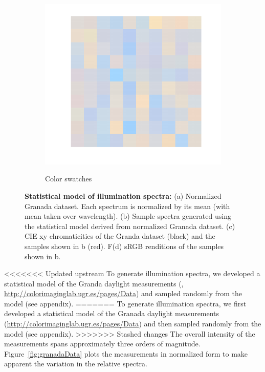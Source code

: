 \documentclass{jov}
\begin{document}
\begin{figure}
\begin{subfigure}[b]{0.24 \textwidth}
        \label{fig:xyDiagram}
        \end{subfigure}
      	\begin{subfigure}[b]{0.24 \textwidth}
    \centering
        \caption{Color swatches}
        \includegraphics[width=\textwidth]{../FiguresDraft4/Figure6/Figure6_d.pdf}
        \label{fig:sRGBIlluminant}
    \end{subfigure}
    \caption{{\bf Statistical model of illumination spectra:} (a) Normalized Granada dataset. Each spectrum is normalized by its mean (with mean taken over wavelength). (b) Sample spectra generated using the statistical model derived from normalized Granada dataset. (c) CIE xy chromaticities of the Granda dataset (black) and the samples shown in b (red). F(d) sRGB renditions of the samples shown in b.}
\label{fig:illuminant}
\end{figure}

<<<<<<< Updated upstream
To generate illumination spectra, we developed a statistical model of the Granda daylight measurements (, \href{http://colorimaginglab.ugr.es/pages/Data}{http://colorimaginglab.ugr.es/pages/Data}) and sampled randomly from the model (see appendix).
=======
To generate illumination spectra, we first developed a statistical model of the Granada daylight measurements (\href{http://colorimaginglab.ugr.es/pages/Data}{http://colorimaginglab.ugr.es/pages/Data}) \cite{hernandez2001color} and then sampled randomly from the model (see appendix).
>>>>>>> Stashed changes
The overall intensity of the measurements spans approximately three orders of magnitude.
Figure~\ref{fig:granadaData} plots the measurements in normalized form to make apparent the variation in the relative spectra.
\end{document}
